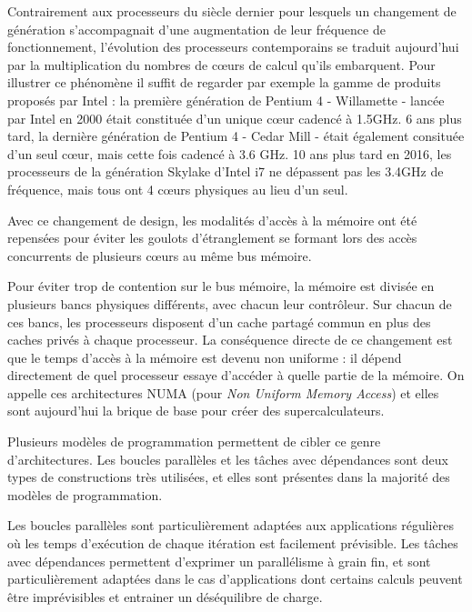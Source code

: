 Contrairement aux processeurs du siècle dernier pour lesquels un changement de génération s'accompagnait d'une augmentation de leur fréquence de fonctionnement, l'évolution des processeurs contemporains se traduit aujourd'hui par la multiplication du nombres de cœurs de calcul qu'ils embarquent.
Pour illustrer ce phénomène il suffit de regarder par exemple la gamme de produits proposés par Intel : la première génération de Pentium 4 - Willamette - lancée par Intel en 2000 était constituée d'un unique cœur cadencé à 1.5GHz. 6 ans plus tard, la dernière génération de Pentium 4 - Cedar Mill - était également consituée d'un seul cœur, mais cette fois cadencé à 3.6 GHz. 10 ans plus tard en 2016, les processeurs de la génération Skylake d'Intel i7 ne dépassent pas les 3.4GHz de fréquence, mais tous ont 4 cœurs physiques au lieu d'un seul.

Avec ce changement de design, les modalités d'accès à la mémoire ont été repensées pour éviter les goulots d'étranglement se formant lors des accès concurrents de plusieurs cœurs au même bus mémoire.

Pour éviter trop de contention sur le bus mémoire, la mémoire est divisée en plusieurs bancs physiques différents, avec chacun leur contrôleur.
Sur chacun de ces bancs, les processeurs disposent d'un cache partagé commun en plus des caches privés à chaque processeur.
La conséquence directe de ce changement est que le temps d'accès à la mémoire est devenu non uniforme : il dépend directement de quel processeur essaye d'accéder à quelle partie de la mémoire.
On appelle ces architectures NUMA (pour \emph{Non Uniform Memory Access}) et elles sont aujourd'hui la brique de base pour créer des supercalculateurs.

Plusieurs modèles de programmation permettent de cibler ce genre d'architectures.
Les boucles parallèles et les tâches avec dépendances sont deux types de constructions très utilisées, et elles sont présentes dans la majorité des modèles de programmation.

Les boucles parallèles sont particulièrement adaptées aux applications régulières où les temps d'exécution de chaque itération est facilement prévisible.
Les tâches avec dépendances permettent d'exprimer un parallélisme à grain fin, et sont particulièrement adaptées dans le cas d'applications dont certains calculs peuvent être imprévisibles et entrainer un déséquilibre de charge.

